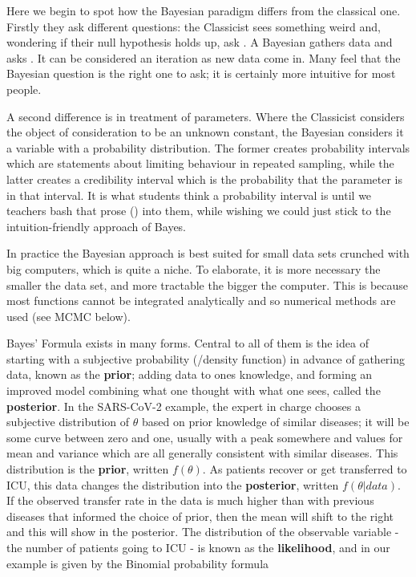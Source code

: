 \documentclass{article}
\begin{document}
Here we begin to spot how the Bayesian paradigm differs from the classical one. Firstly they ask different questions: the Classicist sees something weird and, wondering if their null hypothesis holds up, ask . A Bayesian gathers data and asks . It can be considered an iteration as new data come in. Many feel that the Bayesian question is the right one to ask; it is certainly more intuitive for most people.

A second difference is in treatment of parameters. Where the Classicist considers the object of consideration to be an unknown constant, the Bayesian considers it a variable with a probability distribution. The former creates probability intervals which are statements about limiting behaviour in repeated sampling, while the latter creates a credibility interval which is the probability that the parameter is in that interval. It is what students think a probability interval is until we teachers bash that prose () into them, while wishing we could just stick to the intuition-friendly approach of Bayes.

In practice the Bayesian approach is best suited for small data sets crunched with big computers, which is quite a niche. To elaborate, it is more necessary the smaller the data set, and more tractable the bigger the computer. This is because most functions cannot be integrated analytically and so numerical methods are used (see MCMC below).

Bayes' Formula exists in many forms. Central to all of them is the idea of starting with a subjective probability (/density function) in advance of gathering data, known as the \textbf{prior}; adding data to ones knowledge, and forming an improved model combining what one thought with what one sees, called the \textbf{posterior}. In the SARS-CoV-2 example, the expert in charge chooses a subjective distribution of $\theta$ based on prior knowledge of similar diseases; it will be some curve between zero and one, usually with a peak somewhere and values for mean and variance which are all generally consistent with similar diseases. This distribution is the \textbf{prior}, written $f(\theta)$. As patients recover or get transferred to ICU, this data changes the distribution into the \textbf{posterior}, written $f(\theta|data)$. If the observed transfer rate in the data is much higher than with previous diseases that informed the choice of prior, then the mean will shift to the right and this will show in the posterior. The distribution of the observable variable - the number of patients going to ICU - is known as the \textbf{likelihood}, and in our example is given by the Binomial probability formula
\end{document}
